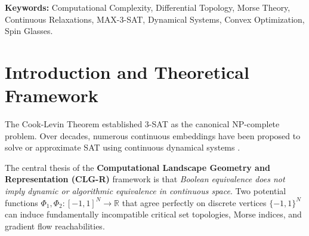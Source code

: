 \documentclass[11pt,a4paper]{article}
\begin{document}
\begin{abstract}
(8) For the independent-clause random 3-SAT ensemble, we prove analytically that the normalized volume of the LP polytope satisfies the finite-dimensional lower bound $\mathbb{E}[\mu_{\rm norm}(Z)] \ge (5/6)^{\lfloor \alpha N \rfloor} \ge e^{-N \alpha \ln(6/5)} > 0$ via the Irwin-Hall distribution of order 3;
(9) We analyze dynamical behavior in monotone Horn families: purely negative clauses have competitive off-diagonal sign ($J_{ij}\le0$), while general Horn clauses can have mixed Jacobian signs; consequently standard orthant-monotonicity results do not settle the general case, and Hinge separation on Horn DAGs remains open after the singleton collapse under positive unit facts;
(10) An adversarial audit refutes the previously claimed complete subcritical separation: an isolated six-clause linear hypertree is the minimal linear-hypertree obstruction with an open basin of positive multilinear residual energy. In the uniform distinct-clause ensemble,
$\liminf_{N\to\infty}\bar\rho_{N,\rm mult}(\alpha)\ge (729/2^{59})\alpha^5e^{-39\alpha}>0$ for every fixed $\alpha>0$, and
$\mathbb P_{F,x_0}[\rho_{N,\rm mult}(F,x_0)\ge(729/2^{60})\alpha^5e^{-39\alpha}]\to1$.
Pointwise convergence of the projected multilinear flow remains valid through nonsmooth Kurdyka--\L{}ojasiewicz theory, but convergence to zero residual energy does not.
For the random 3-SAT ensemble, the remaining clustering-regime conjecture is therefore comparative ($\rho_{\rm quad}>\rho_{\rm mult}$), not positivity of the multilinear residual.
\end{abstract}

\noindent\textbf{Keywords:} Computational Complexity, Differential Topology, Morse Theory, Continuous Relaxations, MAX-3-SAT, Dynamical Systems, Convex Optimization, Spin Glasses.

\section{Introduction and Theoretical Framework}

The Cook-Levin Theorem \cite{cook1971complexity, levin1973universal, karp1972reducibility} established 3-SAT as the canonical NP-complete problem. Over decades, numerous continuous embeddings have been proposed to solve or approximate SAT using continuous dynamical systems \cite{gu1994global, kurchan1993barriers, mezard2002analytic, ercsey2011optimization, molnar2018continuous}. 

The central thesis of the \textbf{Computational Landscape Geometry and Representation (CLG-R)} framework is that \textit{Boolean equivalence does not imply dynamic or algorithmic equivalence in continuous space}. Two potential functions $\Phi_1, \Phi_2: [-1, 1]^N \to \mathbb{R}$ that agree perfectly on discrete vertices $\{-1, 1\}^N$ can induce fundamentally incompatible critical set topologies, Morse indices, and gradient flow reachabilities.
\end{document}
